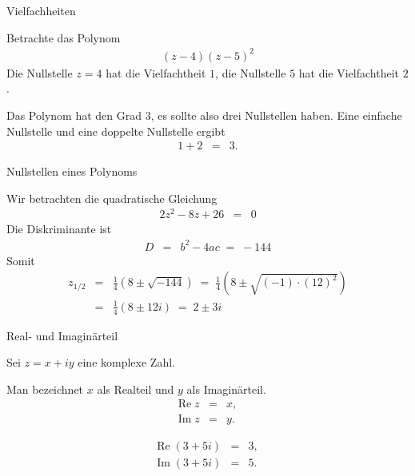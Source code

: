 \documentclass[german]{beamer}
\newcommand{\bq}{\begin{eqnarray*}}
\newcommand{\eq}{\end{eqnarray*}}
\begin{document}
\begin{frame}{Vielfachheiten}

\begin{example}
Betrachte das Polynom
\bq
 \left(z-4\right) \left(z-5\right)^2
\eq
Die Nullstelle $z=4$ hat die Vielfachtheit $1$, die Nullstelle $5$ hat die Vielfachtheit $2$.

Das Polynom hat den Grad $3$, es sollte also drei Nullstellen haben.
Eine einfache Nullstelle und eine doppelte Nullstelle ergibt
\bq
 1 + 2 & = & 3.
\eq
\end{example}

\end{frame}

\begin{frame}{Nullstellen eines Polynoms}

\begin{example}
Wir betrachten die quadratische Gleichung
\bq
 2 z^2 - 8 z + 26 & = & 0
\eq
Die Diskriminante ist
\bq
 D & = & b^2 - 4 a c \; = \; -144
\eq
Somit
\bq
 z_{1/2}
 & = &
 \frac{1}{4} \left( 8 \pm \sqrt{-144} \right)
 \; = \;
 \frac{1}{4} \left( 8 \pm \sqrt{\left(-1\right) \cdot \left(12\right)^2} \right)
 \nonumber \\
 & = &
 \frac{1}{4} \left( 8 \pm 12 i \right)
 \; = \; 
 2 \pm 3 i
\eq


\end{example}

\end{frame}

\begin{frame}{Real- und Imagin\"arteil}

\begin{definition}
Sei $z=x+iy$ eine komplexe Zahl. 

Man bezeichnet $x$ als \alert{Realteil} und $y$ als \alert{Imagin\"arteil}.
\bq
 \mathrm{Re}\;z & = & x,
 \nonumber \\
 \mathrm{Im}\;z & = & y.
\eq
\end{definition}

\begin{example}
\bq
 \mathrm{Re}\;\left(3+5i\right) & = & 3,
 \nonumber \\
 \mathrm{Im}\;\left(3+5i\right) & = & 5.
\eq
\end{example}

\end{frame}
\end{document}
